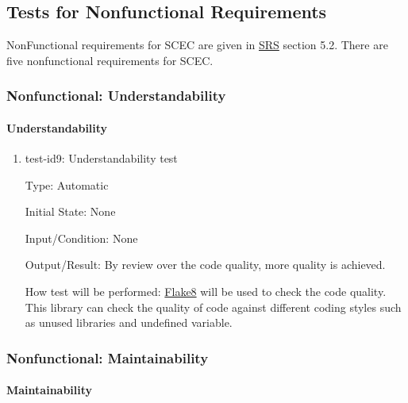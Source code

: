 \documentclass[12pt, titlepage]{article}
\begin{document}
\subsection{Tests for Nonfunctional Requirements}

NonFunctional requirements for SCEC are given in \href{https://github.com/DeeshaPatel/CAS-741-Solar-Cooker/blob/7c53c8d9a19ca2f94dfba6ba9208eae0bf03b8cc/docs/SRS/SRS.pdf}{SRS} section 5.2. There are five nonfunctional requirements for SCEC. 




\subsubsection{Nonfunctional: Understandability}
\label{non_functional_understandability}		
\paragraph{Understandability}

\begin{enumerate}

\item{test-id9: Understandability test\\}

Type: Automatic
					
Initial State: None
					
Input/Condition: None
					
Output/Result: By review over the code quality, more quality is achieved. 
					
How test will be performed: \href{https://pypi.org/project/flake8/}{Flake8} will be used to check the code quality. This library can check the quality of code against different coding styles such as unused libraries and undefined variable. 


\end{enumerate}

\subsubsection{Nonfunctional: Maintainability}
\label{non_functional_maintainability}	
\paragraph{Maintainability}
\end{document}

